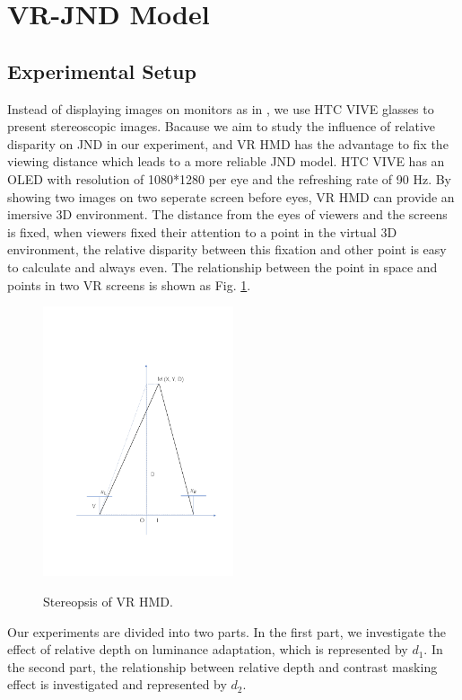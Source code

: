 \documentclass[journal]{IEEEtran}
\begin{document}
\section{VR-JND Model}

\subsection{Experimental Setup}

Instead of displaying images on monitors as in \cite{RN637}, we use HTC VIVE glasses to present stereoscopic images. Bacause we aim to study the influence of relative disparity on JND in our experiment, and VR HMD has the advantage to fix the viewing distance which leads to a more reliable JND model. HTC VIVE has an OLED with resolution of 1080*1280 per eye and the refreshing rate of 90 Hz. By showing two images on two seperate screen before eyes, VR HMD can provide an imersive 3D environment. The distance from the eyes of viewers and the screens is fixed, when viewers fixed their attention to a point in the virtual 3D environment, the relative disparity between this fixation and other point is easy to calculate and always even. The relationship between the point in space and points in two VR screens is shown as Fig. \ref{fig:Stereopsis}.
\begin{figure}[!t]
	\centering
	\includegraphics[width=0.5\textwidth]{Drawing1}\\
	\caption{Stereopsis of VR HMD.}
	\label{fig:Stereopsis}
\end{figure}

Our experiments are divided into two parts. In the first part, we investigate the effect of relative depth on luminance adaptation, which is represented by $d_1$. In the second part, the relationship between relative depth and contrast masking effect is investigated and represented by $d_2$.
\end{document}
